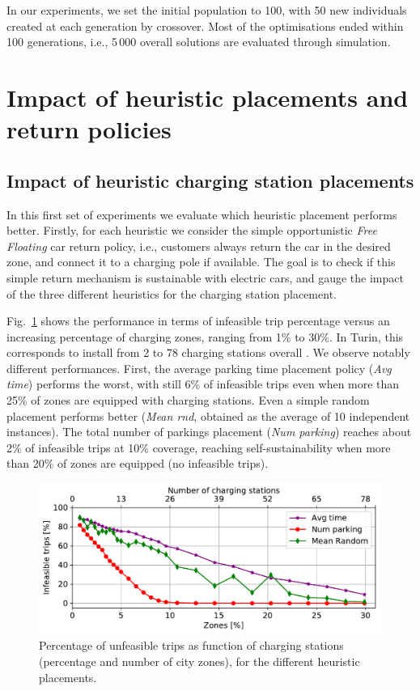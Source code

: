 \documentclass[review, letterpaper,3p, 11pt]{elsarticle}
\providecommand{\DIFaddtex}[1]{{\protect\color{blue}\uwave{#1}}} %
\providecommand{\DIFaddbegin}{} %
\providecommand{\DIFaddend}{} %
\providecommand{\DIFadd}[1]{\texorpdfstring{\DIFaddtex{#1}}{#1}} %
\begin{document}
In our experiments, we set the initial population to 100, with 50 new individuals created at each generation by crossover. Most of the optimisations ended within 100 generations, i.e., 5\,000 overall solutions are evaluated through simulation.
\section{Impact of heuristic placements and return policies}
\label{sec:freefloating}





\subsection{Impact of heuristic charging station placements}

In this first set of experiments we evaluate which heuristic placement performs better.
Firstly, for each heuristic we consider the simple opportunistic \textit{Free Floating} car return policy, i.e., customers always return the car in the desired zone, and connect it to a charging pole if available. The goal is to check if this simple return mechanism is sustainable with electric cars, and gauge the impact of the three different heuristics for the charging station placement.

Fig.~\ref{fig:deathsVsZones_algorithm} shows the performance in terms of infeasible trip percentage versus an increasing percentage of charging zones, ranging from  1\% to 30\%. In Turin, this corresponds to install from 2 to 78 charging stations overall \DIFaddbegin \DIFadd{(reported in the top x-axis)}\DIFaddend .
We observe notably different performances. First, the average parking time placement policy (\textit{Avg time}) performs the worst, with still 6\% of infeasible trips even when  more than 25\% of zones are equipped with charging stations. Even a simple random placement performs better (\textit{Mean rnd}, obtained as the average of 10 independent instances). The total number of parkings placement (\textit{Num parking}) reaches about 2\% of infeasible trips at 10\% coverage, reaching self-sustainability when more than 20\% of zones are equipped (no infeasible trips).

\begin{figure}[ht]
	\centering
	\includegraphics[width=0.9\columnwidth]{figures/Torino_FF_deaths_probs.pdf}
	\caption{Percentage of unfeasible trips as function of charging stations (percentage and number of city zones), for the different heuristic placements.}
	\label{fig:deathsVsZones_algorithm}
\end{figure}
\end{document}
